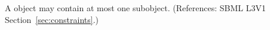 A \Constraint object may contain at most one \Message subobject.
(References: SBML L3V1 Section~\ref{sec:constraints}.)
